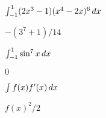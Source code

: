 \begin{exercises}
\begin{exercise} $\int_{-1}^1 (2x^3-1)(x^4-2x)^6\, d x$
\begin{answer} $-(3^7+1)/14$
\end{answer}\end{exercise}

\begin{exercise} $\int_{-1}^1 \sin^7 x\, d x$
\begin{answer} $0$
\end{answer}\end{exercise}

\begin{exercise} $\int f(x) f'(x)\, d x$ 
\begin{answer} $f(x)^2/2$
\end{answer}\end{exercise}

\endtwocol

\end{exercises}
